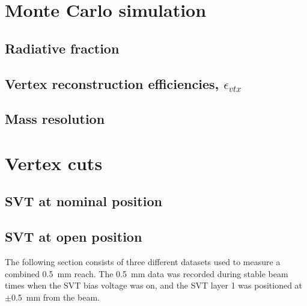 \documentclass[12pt]{report}
\begin{document}
\section{Monte Carlo simulation}
\subsection{Radiative fraction}
%

\subsection{Vertex reconstruction efficiencies, $\epsilon_{vtx}$}
\subsection{Mass resolution}



%


\section{Vertex cuts}
\subsection{SVT at nominal position}
\subsection{SVT at open position}



The following section consists of three different datasets used to measure a combined 0.5~mm reach. The 0.5~mm data was recorded during stable beam times when the SVT bias voltage was on, and the SVT layer 1 was positioned at $\pm$0.5~mm from the beam. 

%
%
%
\end{document}
